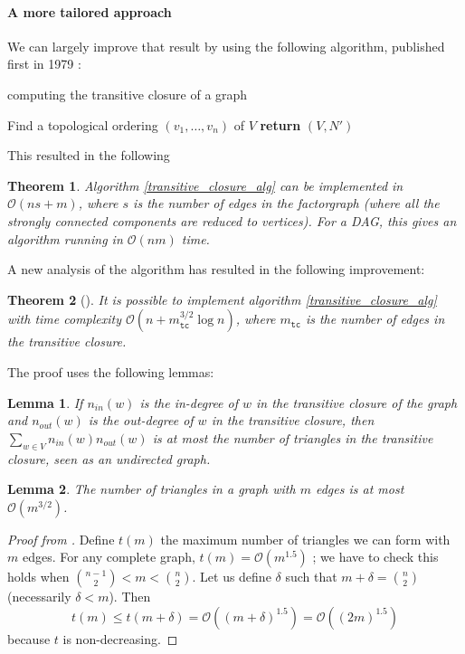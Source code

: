 \documentclass[11pt,a4paper]{article}
\newcommand{\BigO}{\mathcal O}
\newtheorem{Theo}{Theorem}
\newtheorem{Lemma}{Lemma}
\theoremstyle{definition}
\begin{document}
\paragraph{A more tailored approach} We can largely improve that 
result by using the following algorithm, published first in 1979
\cite{goralvcikova1979reduct}:

\begin{algorithm}
  \LinesNumbered
  \SetAlgoVlined
   
  \caption{computing the transitive closure of a graph}
  \label{transitive_closure_alg}

  Find a topological ordering $(v_1,\dots,v_n)$ of $V$\;
  \textbf{return} $(V, N')$\;
\end{algorithm}
This resulted in the following
\begin{Theo}
Algorithm \ref{transitive_closure_alg} can be implemented 
in $\BigO(ns+m)$, where $s$ is the number of edges in the 
factorgraph (where all the strongly connected components
are reduced to vertices). For a DAG, this gives an algorithm
running in $\BigO(nm)$ time.
\end{Theo}

A new analysis of the algorithm has resulted in the following
improvement:

\begin{Theo}[\cite{borassi2015into}]
  It is possible to implement algorithm \ref{transitive_closure_alg} with
  time complexity $\BigO\left(n+m_{\texttt{tc}}^{3/2}\log n\right)$,
  where $m_{\texttt{tc}}$ is the number of edges in the transitive closure.
\end{Theo}

The proof uses the following lemmas:
\begin{Lemma}
\label{lemma_deg_tri}
If $n_{in}(w)$ is the in-degree of $w$ in the transitive closure
of the graph and $n_{out}(w)$ is the out-degree of $w$ in the
transitive closure, then $\sum_{w\in V}n_{in}(w)n_{out}(w)$ is
at most the number of triangles in the transitive closure, seen as
an undirected graph.
\end{Lemma}

\begin{Lemma}
\label{lemma_tri_bound}
The number of triangles in a graph with $m$ edges is at most $\BigO(m^{3/2})$.
\end{Lemma}
\begin{proof}[Proof from \cite{bound_triangles}]
Define $t(m)$ the maximum number of triangles we can form with
$m$ edges. For any complete graph, $t(m)=\BigO(m^{1.5})$ ; we have to check this holds when
${n-1 \choose 2} < m < {n\choose 2}$. Let us define $\delta$ such that
$m+\delta = {n \choose 2}$ (necessarily $\delta < m$). Then
\[ t(m) \leq t(m+\delta) = \BigO((m+\delta)^{1.5}) = \BigO((2m)^{1.5}) \]
because $t$ is non-decreasing.
\end{proof}
\end{document}
